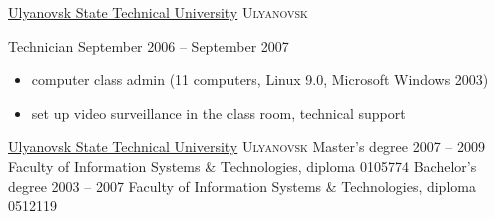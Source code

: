 \documentclass[unicode, 10pt, a4paper, oneside, fleqn]{article}
\begin{document}

\job
    {\href{http://www.ulstu.ru}{Ulyanovsk State Technical University}}
    {\textsc{Ulyanovsk}}
    {
        \position
            {Technician}
            {September 2006 -- September 2007}
            {
                \begin{itemize}
                    \item{computer class admin (11 computers,
                           Linux 9.0, Microsoft Windows 2003})
                    \item{set up video surveillance in the class room, technical support}
                \end{itemize}
            }
    }




\job
    {\href{http://www.ulstu.ru}{Ulyanovsk State Technical University}}
    {\textsc{Ulyanovsk}}
    {
        \positionnobreak
            {Master's degree}
            {2007 -- 2009}
            {Faculty of Information Systems \& Technologies, diploma  0105774}
        \positionnobreak
            {Bachelor's degree}
            {2003 -- 2007}
            {Faculty of Information Systems \& Technologies, diploma  0512119}
    }

\end{document}
